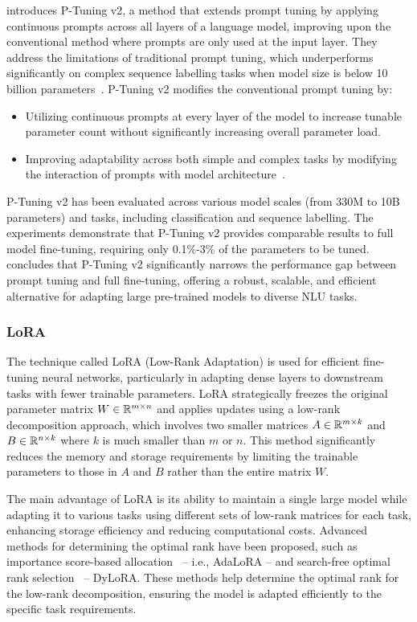 \textcite{liu2022ptuning} introduces P-Tuning v2, a method that extends prompt tuning by applying continuous prompts across all layers of a language model, improving upon the conventional method where prompts are only used at the input layer.
They address the limitations of traditional prompt tuning, which underperforms significantly on complex sequence labelling tasks when model size is below 10 billion parameters~\cite{lester2021power}.
P-Tuning v2 modifies the conventional prompt tuning by:
\begin{itemize}
	\item Utilizing continuous prompts at every layer of the model to increase tunable parameter count without significantly increasing overall parameter load.
	\item Improving adaptability across both simple and complex tasks by modifying the interaction of prompts with model architecture~\cite{li2021prefixtuning, qin2021learning}.
\end{itemize}
P-Tuning v2 has been evaluated across various model scales (from 330M to 10B parameters) and tasks, including classification and sequence labelling.
The experiments demonstrate that P-Tuning v2 provides comparable results to full model fine-tuning, requiring only 0.1\%-3\% of the parameters to be tuned.
\textcite{liu2022ptuning} concludes that P-Tuning v2 significantly narrows the performance gap between prompt tuning and full fine-tuning, offering a robust, scalable, and efficient alternative for adapting large pre-trained models to diverse NLU tasks.

\subsubsection{LoRA}
\label{subsubsec:lora}

The technique called LoRA (Low-Rank Adaptation) is used for efficient fine-tuning neural networks, particularly in adapting dense layers to downstream tasks with fewer trainable parameters.
LoRA strategically freezes the original parameter matrix $W \in \mathbb{R}^{m \times n}$ and applies updates using a low-rank decomposition approach, which involves two smaller matrices $A \in \mathbb{R}^{m \times k}$ and $B \in \mathbb{R}^{n \times k}$ where $k$ is much smaller than $m$ or $n$.
This method significantly reduces the memory and storage requirements by limiting the trainable parameters to those in $A$ and $B$ rather than the entire matrix $W$.

The main advantage of LoRA is its ability to maintain a single large model while adapting it to various tasks using different sets of low-rank matrices for each task, enhancing storage efficiency and reducing computational costs.
Advanced methods for determining the optimal rank have been proposed, such as importance score-based allocation~\cite{zhang2023adalora} -- i.e., AdaLoRA -- and search-free optimal rank selection~\cite{valipour2023dylora} -- DyLoRA\@.
These methods help determine the optimal rank for the low-rank decomposition, ensuring the model is adapted efficiently to the specific task requirements.

